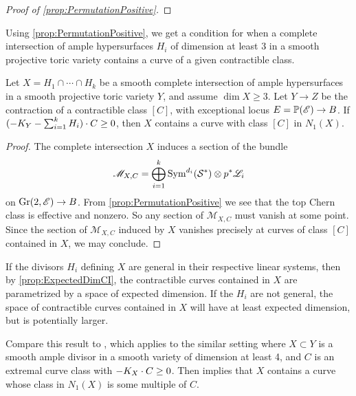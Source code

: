 \begin{proof}[Proof of \cref{prop:PermutationPositive}]
\end{proof}


Using \cref{prop:PermutationPositive}, we get a condition for when a complete intersection of ample hypersurfaces $H_i$ of dimension at least 3 in a smooth projective toric variety contains a curve of a given contractible class.
\begin{corollary}
	\label{cor:NegativeCurveContained}
	Let $X = H_1 \cap \cdots \cap H_k$ be a smooth complete intersection of ample hypersurfaces in a smooth projective toric variety $Y$, and assume $\dim X \geq 3$.
Let $Y \to Z$ be the contraction of a contractible class $[C]$, with exceptional locus $E = \mathbb{P}(\mathscr{E}) \to B$. If $(-K_Y - \sum_{i=1}^k H_i) \cdot C \geq 0$, then $X$ contains a curve with class $[C]$ in $N_1(X)$. 
\end{corollary}
\begin{proof}
The complete intersection $X$ induces a section of the bundle 
	\[\mathscr{M}_{X,C} = \bigoplus_{i=1}^k \operatorname{Sym}^{d_i}(\mathcal{S}^*) \otimes p^*\mathscr{L}_i\]
	 on $\operatorname{Gr}(2,\mathscr{E}) \to B$. From \cref{prop:PermutationPositive} we see that the top Chern class is effective and nonzero. So any section of $\mathscr{M}_{X,C}$ must vanish at some point. Since the section of $\mathscr{M}_{X,C}$ induced by $X$ vanishes precisely at curves of class $[C]$ contained in $X$, we may conclude. 
\end{proof}
If the divisors $H_i$ defining $X$ are general in their respective linear systems, then by \cref{prop:ExpectedDimCI}, the contractible curves contained in $X$ are parametrized by a space of expected dimension. If the $H_i$ are not general, the space of contractible curves contained in $X$ will have at least expected dimension, but is potentially larger.
\begin{remark}
	Compare this result to \cite[Theorem 4.3]{HLW02}, which applies to the similar setting where $X \subset Y$ is a smooth ample divisor in a smooth variety of dimension at least 4, and $C$ is an extremal curve class with $-K_X \cdot C \geq 0$. Then \cite[Theorem 4.3]{HLW02} implies that $X$ contains a curve whose class in $N_1(X)$ is some multiple of $C$.
\end{remark}

